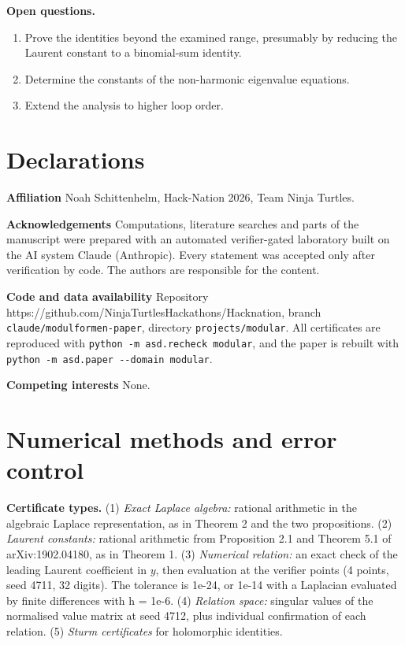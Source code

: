 \documentclass[10pt,twocolumn]{article}
\providecommand{\tightlist}{\setlength{\itemsep}{0pt}\setlength{\parskip}{0pt}}
\theoremstyle{definition}\newtheorem{definition}{Definition}\newtheorem{example}{Example}
\begin{document}
\textbf{Open questions.}

\begin{enumerate}
\def\labelenumi{(\roman{enumi})}
\tightlist
\item
  Prove the identities beyond the examined range, presumably by reducing the Laurent constant to a binomial-sum identity.
\item
  Determine the constants of the non-harmonic eigenvalue equations.
\item
  Extend the analysis to higher loop order.
\end{enumerate}

\section*{Declarations}\label{declarations}

\textbf{Affiliation} Noah Schittenhelm, Hack-Nation 2026, Team Ninja Turtles.

\textbf{Acknowledgements} Computations, literature searches and parts of the manuscript were prepared with an automated verifier-gated laboratory built on the AI system Claude (Anthropic). Every statement was accepted only after verification by code. The authors are responsible for the content.

\textbf{Code and data availability} Repository https://github.com/NinjaTurtlesHackathons/Hacknation, branch \texttt{claude/modulformen-paper}, directory \texttt{projects/modular}. All certificates are reproduced with \texttt{python\ -m\ asd.recheck\ modular}, and the paper is rebuilt with \texttt{python\ -m\ asd.paper\ -\/-domain\ modular}.

\textbf{Competing interests} None.

\appendix

\section{Numerical methods and error control}\label{numerical-methods-and-error-control}

\textbf{Certificate types.} (1) \emph{Exact Laplace algebra:} rational arithmetic in the algebraic Laplace representation, as in Theorem 2 and the two propositions. (2) \emph{Laurent constants:} rational arithmetic from Proposition 2.1 and Theorem 5.1 of arXiv:1902.04180, as in Theorem 1. (3) \emph{Numerical relation:} an exact check of the leading Laurent coefficient in \(y\), then evaluation at the verifier points (4 points, seed 4711, 32 digits). The tolerance is 1e-24, or 1e-14 with a Laplacian evaluated by finite differences with h = 1e-6. (4) \emph{Relation space:} singular values of the normalised value matrix at seed 4712, plus individual confirmation of each relation. (5) \emph{Sturm certificates} for holomorphic identities.
\end{document}
